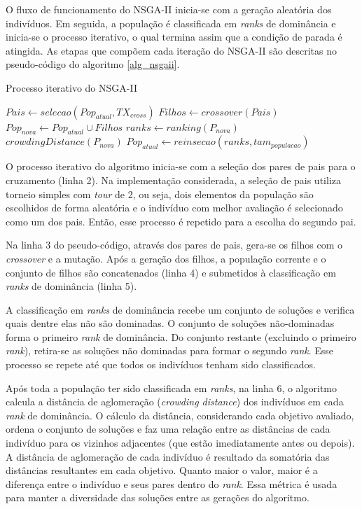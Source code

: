 O fluxo de funcionamento do NSGA-II inicia-se com a geração aleatória dos indivíduos. Em seguida, a população é classificada em \textit{ranks} de dominância e inicia-se o processo iterativo, o qual termina assim que a condição de parada é atingida. As etapas que compõem cada iteração do NSGA-II são descritas no pseudo-código do algoritmo \ref{alg_nsgaii}.

\begin{algorithm}
	\caption{Processo iterativo do NSGA-II}
	\label{alg_nsgaii}
	\begin{algorithmic}[1]
		\State $Pais \gets selecao(Pop_{atual}, TX_{cross})$
		\State $Filhos \gets crossover(Pais)$
		\State $Pop_{nova} \gets Pop_{atual} \cup Filhos$
		\State $ranks \gets ranking(P_{nova})$
		\State $crowdingDistance(P_{nova})$
		\State $Pop_{atual} \gets reinsecao(ranks, tam_{populacao})$
		\EndWhile
	\end{algorithmic}
\end{algorithm}

O processo iterativo do algoritmo inicia-se com a seleção dos pares de pais para o cruzamento (linha 2). Na implementação considerada, a seleção de pais utiliza torneio simples com \textit{tour} de 2, ou seja, dois elementos da população são escolhidos de forma aleatória e o indivíduo com melhor avaliação é selecionado como um dos pais. Então, esse processo é repetido para a escolha do segundo pai.

Na linha 3 do pseudo-código, através dos pares de pais, gera-se os filhos com o \textit{crossover} e a mutação. Após a geração dos filhos, a população corrente e o conjunto de filhos são concatenados (linha 4) e submetidos à classificação em \textit{ranks} de dominância (linha 5).

A classificação em \textit{ranks} de dominância recebe um conjunto de soluções e verifica quais dentre elas não são dominadas. O conjunto de soluções não-dominadas forma o primeiro \textit{rank} de dominância. Do conjunto restante (excluindo o primeiro \textit{rank}), retira-se as soluções não dominadas para formar o segundo \textit{rank}. Esse processo se repete até que todos os indivíduos tenham sido classificados.

Após toda a população ter sido classificada em \textit{ranks}, na linha 6, o algoritmo calcula a distância de aglomeração (\textit{crowding distance}) dos indivíduos em cada \textit{rank} de dominância. O cálculo da distância, considerando cada objetivo avaliado, ordena o conjunto de soluções e faz uma relação entre as distâncias de cada indivíduo para os vizinhos adjacentes (que estão imediatamente antes ou depois). A distância de aglomeração de cada indivíduo é resultado da somatória das distâncias resultantes em cada objetivo.  Quanto maior o valor, maior é a diferença entre o indivíduo e seus pares dentro do \textit{rank}. Essa métrica é usada para manter a diversidade das soluções entre as gerações do algoritmo.

